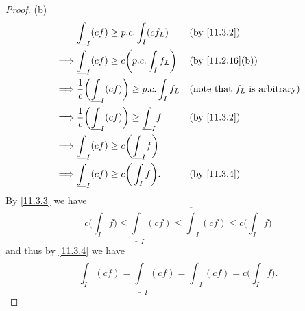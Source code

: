 \begin{proof}{(b)}
\begin{align*}
             & \underline{\int}_I (cf) \geq p.c. \int_I (c f_L)                           &  & \text{(by \cref{11.3.2})}               \\
    \implies & \underline{\int}_I (cf) \geq c \bigg(p.c. \int_I f_L\bigg)                 &  & \text{(by \cref{11.2.16}(b))}           \\
    \implies & \dfrac{1}{c} \bigg(\underline{\int}_I (cf)\bigg) \geq p.c. \int_I f_L      &  & \text{(note that \(f_L\) is arbitrary)} \\
    \implies & \dfrac{1}{c} \bigg(\underline{\int}_I (cf)\bigg) \geq \underline{\int}_I f &  & \text{(by \cref{11.3.2})}               \\
    \implies & \underline{\int}_I (cf) \geq c\bigg(\underline{\int}_I f\bigg)                                                          \\
    \implies & \underline{\int}_I (cf) \geq c\bigg(\int_I f\bigg).                        &  & \text{(by \cref{11.3.4})}
  \end{align*}
  By \cref{11.3.3} we have
  \[
    c\bigg(\int_I f\bigg) \leq \underline{\int}_I (cf) \leq \overline{\int}_I (cf) \leq c\bigg(\int_I f\bigg)
  \]
  and thus by \cref{11.3.4} we have
  \[
    \int_I (cf) = \underline{\int}_I (cf) = \overline{\int}_I (cf) = c\bigg(\int_I f\bigg).
  \]


\end{proof}
